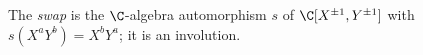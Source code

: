 The \emph{swap} is the $\C$-algebra automorphism $s$ of $\C[X^{\pm1},Y^{\pm1}]$ with $s(X^aY^b)=X^bY^a$; it is an involution.

